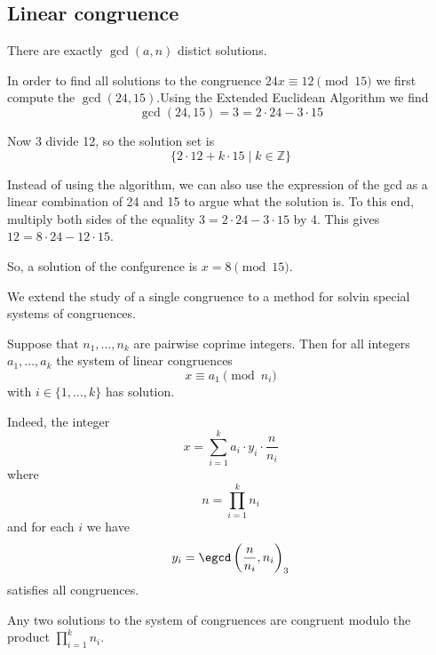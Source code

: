 \subsection{Linear congruence}

\begin{algorithm}
\end{algorithm}

\begin{remark}
    There are exactly $ \gcd(a,n) $ distict solutions.
\end{remark}

\begin{example}
In order to find all solutions to the congruence $ 24x \equiv 12 \pmod{15} $
we first compute the $ \gcd(24,15) $.Using the Extended Euclidean Algorithm
we find
$$ \gcd(24,15) = 3 = 2 \cdot 24 - 3 \cdot 15 $$

Now 3 divide 12, so the solution set is
$$ \{2 \cdot 12 + k \cdot 15 \mid k \in \mathbb{Z}\} $$
\end{example}

Instead of using the algorithm, we can also use the expression of the gcd as
a linear combination of 24 and 15 to argue what the solution is. To this end,
multiply both sides of the equality $ 3 = 2 \cdot 24 - 3 \cdot 15 $ by 4. This
gives $ 12 = 8 \cdot 24 - 12 \cdot 15 $.

So, a solution of the confgurence is $ x = 8 \pmod{15} $.

We extend the study of a single congruence to a method for solvin special
systems of congruences.

\begin{theorem}
    Suppose that $ n_1,\dots,n_k $ are pairwise coprime integers. Then for
    all integers $ a_1,\dots,a_k $ the system of linear congruences
    $$ x \equiv a_1 \pmod{n_i} $$
    with $ i \in  \{1,\dots,k\} $ has solution.

    Indeed, the integer
    $$ x = \sum_{i=1}^{k}a_i \cdot y_i \cdot \frac{n}{n_i} $$
    where
    $$ n = \prod_{i=1}^kn_i $$
    and for each $i$ we have
    $$ y_i = \egcd\left(\frac{n}{n_i},n_i\right)_3 $$
    satisfies all congruences.

    Any two solutions to the system of congruences are congruent modulo the
    product $ \displaystyle\prod_{i=1}^{k}n_i $.
\end{theorem}



